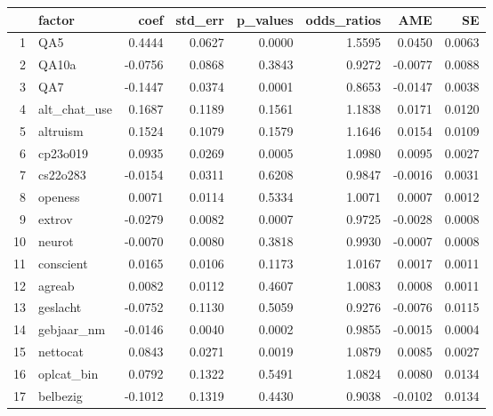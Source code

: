 \begin{table}[ht]
\centering
\begin{tabular}{rlrrrrrr}
  \hline
 & factor & coef & std\_err & p\_values & odds\_ratios & AME & SE \\ 
  \hline
1 & QA5 & 0.4444 & 0.0627 & 0.0000 & 1.5595 & 0.0450 & 0.0063 \\ 
  2 & QA10a & -0.0756 & 0.0868 & 0.3843 & 0.9272 & -0.0077 & 0.0088 \\ 
  3 & QA7 & -0.1447 & 0.0374 & 0.0001 & 0.8653 & -0.0147 & 0.0038 \\ 
  4 & alt\_chat\_use & 0.1687 & 0.1189 & 0.1561 & 1.1838 & 0.0171 & 0.0120 \\ 
  5 & altruism & 0.1524 & 0.1079 & 0.1579 & 1.1646 & 0.0154 & 0.0109 \\ 
  6 & cp23o019 & 0.0935 & 0.0269 & 0.0005 & 1.0980 & 0.0095 & 0.0027 \\ 
  7 & cs22o283 & -0.0154 & 0.0311 & 0.6208 & 0.9847 & -0.0016 & 0.0031 \\ 
  8 & openess & 0.0071 & 0.0114 & 0.5334 & 1.0071 & 0.0007 & 0.0012 \\ 
  9 & extrov & -0.0279 & 0.0082 & 0.0007 & 0.9725 & -0.0028 & 0.0008 \\ 
  10 & neurot & -0.0070 & 0.0080 & 0.3818 & 0.9930 & -0.0007 & 0.0008 \\ 
  11 & conscient & 0.0165 & 0.0106 & 0.1173 & 1.0167 & 0.0017 & 0.0011 \\ 
  12 & agreab & 0.0082 & 0.0112 & 0.4607 & 1.0083 & 0.0008 & 0.0011 \\ 
  13 & geslacht & -0.0752 & 0.1130 & 0.5059 & 0.9276 & -0.0076 & 0.0115 \\ 
  14 & gebjaar\_nm & -0.0146 & 0.0040 & 0.0002 & 0.9855 & -0.0015 & 0.0004 \\ 
  15 & nettocat & 0.0843 & 0.0271 & 0.0019 & 1.0879 & 0.0085 & 0.0027 \\ 
  16 & oplcat\_bin & 0.0792 & 0.1322 & 0.5491 & 1.0824 & 0.0080 & 0.0134 \\ 
  17 & belbezig & -0.1012 & 0.1319 & 0.4430 & 0.9038 & -0.0102 & 0.0134 \\ 
   \hline
\end{tabular}
\end{table}
